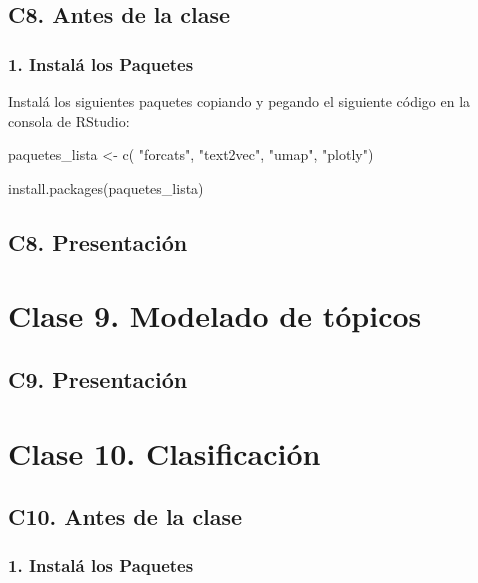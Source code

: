 \documentclass[
  letterpaper,
  DIV=11,
  numbers=noendperiod]{scrreprt}
\newenvironment{Shaded}{\begin{snugshade}}{\end{snugshade}}
\newcommand{\FunctionTok}[1]{\textcolor[rgb]{0.28,0.35,0.67}{#1}}
\newcommand{\NormalTok}[1]{\textcolor[rgb]{0.00,0.23,0.31}{#1}}
\newcommand{\OtherTok}[1]{\textcolor[rgb]{0.00,0.23,0.31}{#1}}
\newcommand{\StringTok}[1]{\textcolor[rgb]{0.13,0.47,0.30}{#1}}
\begin{document}
\chapter{C8. Antes de la clase}\label{c8.-antes-de-la-clase}

\section{\texorpdfstring{\textbf{1. Instalá los
Paquetes}}{1. Instalá los Paquetes}}\label{instaluxe1-los-paquetes-4}

Instalá los siguientes paquetes copiando y pegando el siguiente código
en la consola de RStudio:

\begin{Shaded}
\begin{Highlighting}[]

\NormalTok{paquetes\_lista }\OtherTok{\textless{}{-}} \FunctionTok{c}\NormalTok{(}
  \StringTok{"forcats"}\NormalTok{, }\StringTok{"text2vec"}\NormalTok{, }\StringTok{"umap"}\NormalTok{, }\StringTok{"plotly"}\NormalTok{)}

\FunctionTok{install.packages}\NormalTok{(paquetes\_lista)}
\end{Highlighting}
\end{Shaded}

\chapter{C8. Presentación}\label{c8.-presentaciuxf3n}

\part{Clase 9. Modelado de tópicos }

\chapter{C9. Presentación}\label{c9.-presentaciuxf3n}

\part{Clase 10. Clasificación }

\chapter{C10. Antes de la clase}\label{c10.-antes-de-la-clase}

\section{\texorpdfstring{\textbf{1. Instalá los
Paquetes}}{1. Instalá los Paquetes}}\label{instaluxe1-los-paquetes-5}
\end{document}
